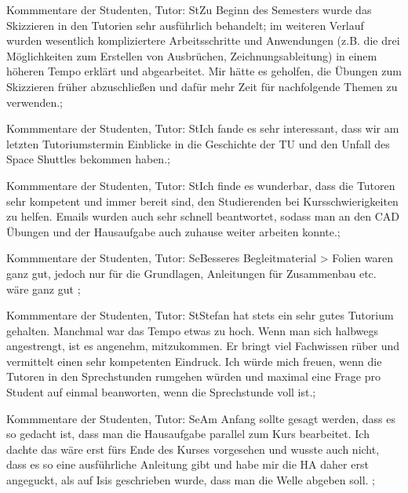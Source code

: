 \documentclass[10pt]{beamer}
\begin{document}
\begin{frame}[fragile]{Kommmentare der Studenten, Tutor: St}Zu Beginn des Semesters wurde das Skizzieren in den Tutorien sehr ausführlich behandelt; im weiteren Verlauf wurden wesentlich kompliziertere Arbeitsschritte und Anwendungen (z.B. die drei Möglichkeiten zum Erstellen von Ausbrüchen, Zeichnungsableitung) in einem höheren Tempo erklärt und abgearbeitet. Mir hätte es geholfen, die Übungen zum Skizzieren früher abzuschließen und dafür mehr Zeit für nachfolgende Themen zu verwenden.;
 \end{frame}
\begin{frame}[fragile]{Kommmentare der Studenten, Tutor: St}Ich fande es sehr interessant, dass wir am letzten Tutoriumstermin Einblicke in die Geschichte der TU und den Unfall des Space Shuttles bekommen haben.;
 \end{frame}
\begin{frame}[fragile]{Kommmentare der Studenten, Tutor: St}Ich finde es wunderbar, dass die Tutoren sehr kompetent und immer bereit sind, den Studierenden bei Kursschwierigkeiten zu helfen. Emails wurden auch sehr schnell beantwortet, sodass man an den CAD Übungen und der Hausaufgabe auch zuhause weiter arbeiten konnte.;
 \end{frame}
\begin{frame}[fragile]{Kommmentare der Studenten, Tutor: Se}Besseres Begleitmaterial   > Folien waren ganz gut, jedoch nur für die Grundlagen, Anleitungen für Zusammenbau etc. wäre ganz gut ;
 \end{frame}
\begin{frame}[fragile]{Kommmentare der Studenten, Tutor: St}Stefan hat stets ein sehr gutes Tutorium gehalten. Manchmal war das Tempo etwas zu hoch. Wenn man sich halbwegs angestrengt, ist es angenehm, mitzukommen. Er bringt viel Fachwissen rüber und vermittelt einen sehr kompetenten Eindruck. Ich würde mich freuen, wenn die Tutoren in den Sprechstunden rumgehen würden und maximal eine Frage pro Student auf einmal beanworten, wenn die Sprechstunde voll ist.;
 \end{frame}
\begin{frame}[fragile]{Kommmentare der Studenten, Tutor: Se}Am Anfang sollte gesagt werden, dass es so gedacht ist, dass man die Hausaufgabe parallel zum Kurs bearbeitet. Ich dachte das wäre erst fürs Ende des Kurses vorgesehen und wusste auch nicht, dass es so eine ausführliche Anleitung gibt und habe mir die HA daher erst angeguckt, als auf Isis geschrieben wurde, dass man die Welle abgeben soll. ;
 \end{frame}
\end{document}
